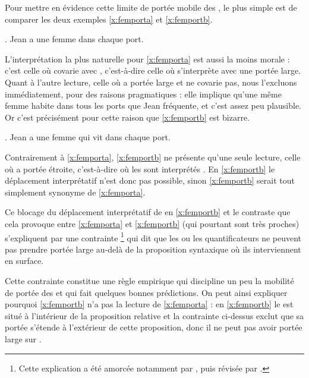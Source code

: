 Pour mettre en évidence cette limite de portée mobile des {\GN}, le
plus simple est de comparer les deux exemples
\ref{x:femporta} et \ref{x:femportb}.

\ex.\label{x:femport}
 Jean a une femme dans chaque port. \label{x:femporta}


L'interprétation la plus naturelle pour \ref{x:femporta} est aussi la
moins morale : c'est celle où  covarie avec
, c'est-à-dire celle où 
s'interprète avec une portée large.  Quant à l'autre lecture, celle où
 a portée large et ne covarie pas, nous l'excluons
immédiatement, pour des raisons pragmatiques : elle implique qu'une
même femme habite dans tous les ports que Jean fréquente, et c'est
assez peu plausible.  Or c'est
précisément pour cette raison que \ref{x:femportb} est bizarre. 

\largerpage

\ex.
\juge{\urgh} Jean a une femme qui vit dans chaque port. \label{x:femportb}

Contrairement à \ref{x:femporta}, \ref{x:femportb} ne présente qu'une
seule lecture, celle où  a portée étroite,
c'est-à-dire où les {\GN} sont interprétés .  En
\ref{x:femportb} le déplacement interprétatif n'est donc pas possible,
sinon \ref{x:femportb} serait tout simplement synonyme de
\ref{x:femporta}. 

Ce blocage du déplacement interprétatif de {\GN} en \ref{x:femportb}
et le contraste que cela provoque entre \ref{x:femporta} et
\ref{x:femportb} (qui pourtant sont très proches) s'expliquent par 
une
contrainte%
\footnote{Cette explication a été amorcée notamment par
  \citet{Rodman:76}, puis révisée par
  \citet{Farkas:81}.} 
qui dit que les
{\GN} ou \label{ct:Portee}
les quantificateurs ne peuvent pas prendre portée large
au-delà de la proposition syntaxique où ils interviennent en surface.



Cette contrainte constitue une règle empirique qui
discipline un peu la mobilité de portée des {\GN} et qui fait quelques
bonnes prédictions.  On peut ainsi expliquer pourquoi \ref{x:femportb}
n'a pas la lecture de \ref{x:femporta} : en \ref{x:femportb} le {\GN}
 est situé à l'intérieur de la proposition relative
 et la contrainte ci-dessus exclut que
sa portée s'étende à l'extérieur de cette proposition, donc il ne peut
pas avoir portée large sur .

